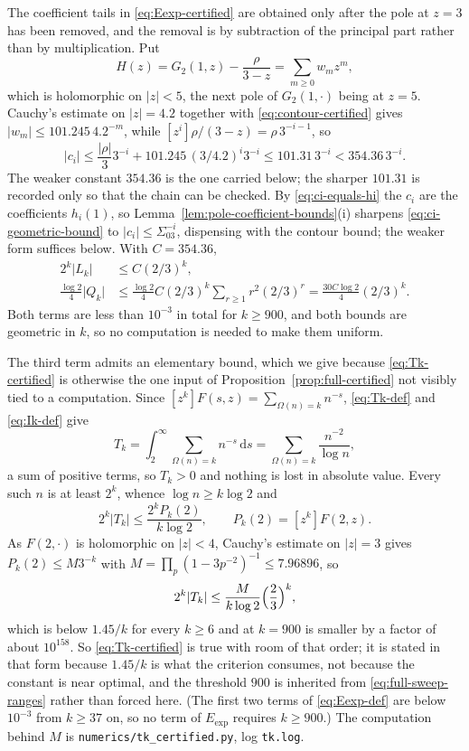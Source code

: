 \documentclass[11pt]{amsart}
\theoremstyle{plain}
\theoremstyle{definition}
\newcommand{\dd}{\,\mathrm d}
\newcommand{\abs}[1]{\lvert #1\rvert}
\begin{document}
The coefficient tails in \eqref{eq:Eexp-certified} are obtained only after the
pole at $z=3$ has been removed, and the removal is by subtraction of the
principal part rather than by multiplication. Put
\[
 H(z)=G_2(1,z)-\frac{\rho}{3-z}=\sum_{m\geq0}w_mz^m,
\]
which is holomorphic on $\abs z<5$, the next pole of $G_2(1,\cdot)$ being at
$z=5$. Cauchy's estimate on $\abs z=4.2$ together with
\eqref{eq:contour-certified} gives $\abs{w_m}\leq101.245\,4.2^{-m}$, while
$[z^i]\rho/(3-z)=\rho\,3^{-i-1}$, so
\begin{equation}\label{eq:ci-geometric-bound}
 \abs{c_i}
 \leq\frac{\abs\rho}{3}3^{-i}+101.245\,(3/4.2)^i3^{-i}
 \leq101.31\,3^{-i}
 <354.36\,3^{-i}.
\end{equation}
The weaker constant $354.36$ is the one carried below; the sharper $101.31$
is recorded only so that the chain can be checked.
By \eqref{eq:ci-equals-hi} the $c_i$ are the coefficients $h_i(1)$, so
Lemma~\ref{lem:pole-coefficient-bounds}(i) sharpens
\eqref{eq:ci-geometric-bound} to $\abs{c_i}\leq\Sigma_03^{-i}$, dispensing with
the contour bound; the weaker form suffices below. With $C=354.36$,
\begin{align*}
 2^k\abs{L_k}
 &\leq C(2/3)^k,\\
 \frac{\log2}{4}\abs{Q_k}
 &\leq\frac{\log2}{4}C(2/3)^k
       \sum_{r\geq1}r^2(2/3)^r
 =\frac{30C\log2}{4}(2/3)^k.
\end{align*}
Both terms are less than $10^{-3}$ in total for $k\geq900$, and both bounds are
geometric in $k$, so no computation is needed to make them uniform.

The third term admits an elementary bound, which we give because
\eqref{eq:Tk-certified} is otherwise the one input of
Proposition~\ref{prop:full-certified} not visibly tied to a computation. Since
$[z^k]F(s,z)=\sum_{\Omega(n)=k}n^{-s}$, \eqref{eq:Tk-def} and
\eqref{eq:Ik-def} give
\[
 T_k=\int_2^\infty\sum_{\Omega(n)=k}n^{-s}\dd s
     =\sum_{\Omega(n)=k}\frac{n^{-2}}{\log n},
\]
a sum of positive terms, so $T_k>0$ and nothing is lost in absolute value.
Every such $n$ is at least $2^k$, whence $\log n\geq k\log2$ and
\[
 2^k\abs{T_k}\leq\frac{2^kP_k(2)}{k\log2},
 \qquad P_k(2)=[z^k]F(2,z).
\]
As $F(2,\cdot)$ is holomorphic on $\abs z<4$, Cauchy's estimate on $\abs z=3$
gives $P_k(2)\leq M3^{-k}$ with
$M=\prod_p(1-3p^{-2})^{-1}\leq7.96896$, so
\begin{equation}\label{eq:Tk-elementary}
 2^k\abs{T_k}\leq\frac{M}{k\log2}\Bigl(\frac23\Bigr)^{k},
\end{equation}
which is below $1.45/k$ for every $k\geq6$ and at $k=900$ is smaller by a
factor of about $10^{158}$. So \eqref{eq:Tk-certified} is true with room of
that order; it is stated in that form because $1.45/k$ is what the criterion
consumes, not because the constant is near optimal, and the threshold $900$ is
inherited from \eqref{eq:full-sweep-ranges} rather than forced here. (The
first two terms of \eqref{eq:Eexp-def} are below $10^{-3}$ from $k\geq37$ on,
so no term of $E_{\exp}$ requires $k\geq900$.) The computation behind
$M$ is \texttt{numerics/tk\_certified.py}, log \texttt{tk.log}.
\end{document}
